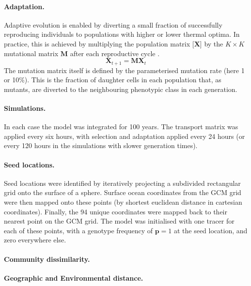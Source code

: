 \documentclass[12pt]{article}
\begin{document}
\paragraph{Adaptation.}

Adaptive evolution is enabled by diverting a small fraction of successfully reproducing individuals to populations with higher or lower thermal optima. In practice, this is achieved by multiplying the population matrix [$\mathbf{X}$] by the $K\times K$ mutational matrix $\mathbf{M}$ after each reproductive cycle \citep{Sauterey:2017,Beckmann:2019}. 
%
\begin{equation}
\label{ }
\mathbf{X}_{t+1} = \mathbf{M}\mathbf{X}_{t}
\end{equation}
%
The mutation matrix itself is defined by the parameterised mutation rate (here 1 or 10\%). This is the fraction of daughter cells in each population that, as mutants, are diverted to the neighbouring phenotypic class in each generation. 

\paragraph{Simulations.}

In each case the model was integrated for 100 years. The transport matrix was applied every six hours, with selection and adaptation applied every 24 hours (or every 120 hours in the simulations with slower generation times).


\paragraph{Seed locations.}

Seed locations were identified by iteratively projecting a subdivided rectangular grid onto the surface of a sphere. Surface ocean coordinates from the GCM grid were then mapped onto these points (by shortest euclidean distance in cartesian coordinates). Finally, the 94 unique coordinates were mapped back to their nearest point on the GCM grid. The model was initialised with one tracer for each of these points, with a genotype frequency of $\mathbf{p} = 1$ at the seed location, and zero everywhere else. 

\paragraph{Community dissimilarity.}

\paragraph{Geographic and Environmental distance.}
\end{document}
